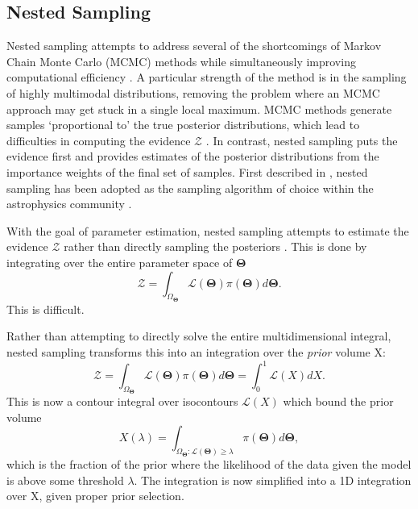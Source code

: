 \subsection{Nested Sampling}
Nested sampling attempts to address several of the shortcomings of Markov Chain Monte Carlo (MCMC) methods while simultaneously improving computational efficiency \parencite{Skilling2004}.
A particular strength of the method is in the sampling of highly multimodal distributions, removing the problem where an MCMC approach may get stuck in a single local maximum.
MCMC methods generate samples `proportional to' the true posterior distributions, which lead to difficulties in computing the evidence $\mathcal{Z}$ \parencite{Speagle2020}. 
In contrast, nested sampling puts the evidence first and provides estimates of the posterior distributions from the importance weights of the final set of samples. First described in \parencite{Skilling2004}, nested sampling has been adopted as the sampling algorithm of choice within the astrophysics community \parencite{Feroz2009,Buchner2014,Feroz2019,Speagle2020}.

With the goal of parameter estimation, nested sampling attempts to estimate the evidence $\mathcal{Z}$ rather than directly sampling the posteriors \parencite{Skilling2004}. 
This is done by integrating over the entire parameter space of $\mathbf{\Theta}$
\begin{equation}
\mathcal{Z} = \int_{\Omega_{\mathbf{\Theta}}}\mathcal{L}(\mathbf{\Theta})\pi(\mathbf{\Theta})d\mathbf{\Theta}.
\end{equation}
This is difficult.

Rather than attempting to directly solve the entire multidimensional integral, nested sampling transforms this into an integration over the \textit{prior} volume X:
\begin{equation}
\mathcal{Z} = \int_{\Omega_{\mathbf{\Theta}}}\mathcal{L}(\mathbf{\Theta})\pi(\mathbf{\Theta})d\mathbf{\Theta} = \int_{0}^{1}\mathcal{L}(X)dX.
\end{equation}
This is now a contour integral over isocontours $\mathcal{L}(X)$ which bound the prior volume
\begin{equation}
X(\lambda) = \int_{\Omega_{\mathbf{\Theta}}:\mathcal{L}(\mathbf{\Theta})\geq\lambda}\pi(\mathbf{\Theta})d\mathbf{\Theta},
\end{equation} 
which is the fraction of the prior where the likelihood of the data given the model is above some threshold $\lambda$.
The integration is now simplified into a 1D integration over X, given proper prior selection.

